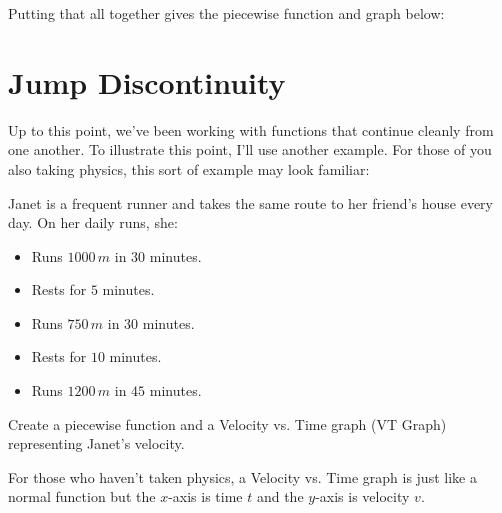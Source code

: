 Putting that all together gives the piecewise function and graph below:
\begin{center}
    \raisebox{0.5cm}{%
        \begin{minipage}[c]{0.48\textwidth}
            \centering
            \[
            g(x) = 
            \begin{cases}
                10x & x \in [0, 4] \\
                7(x - 4) + 40 & x \in (4, 13] \\
                5(x - 13) + 103 & x \in (13, \infty)
            \end{cases}
            \]
        \end{minipage}%
    }
    \begin{minipage}[c]{0.48\textwidth}
        \centering
    \end{minipage}
\end{center}
\clearpage
\section{Jump Discontinuity}
Up to this point, we've been working with functions that continue cleanly from one another. To illustrate this point, I'll use another example. For those of you also taking physics, this sort of example may look familiar:
\begin{problem}
    Janet is a frequent runner and takes the same route to her friend's house every day. On her daily runs, she:
    \begin{itemize}
        \item Runs $1000\,m$ in $30$ minutes.
        \item Rests for $5$ minutes.
        \item Runs $750\,m$ in $30$ minutes.
        \item Rests for $10$ minutes.
        \item Runs $1200\,m$ in $45$ minutes.
    \end{itemize}
    Create a piecewise function and a Velocity vs. Time graph (VT Graph) representing Janet's velocity.
\end{problem}
For those who haven't taken physics, a Velocity vs. Time graph is just like a normal function but the $x$-axis is time $t$ and the $y$-axis is velocity $v$.


